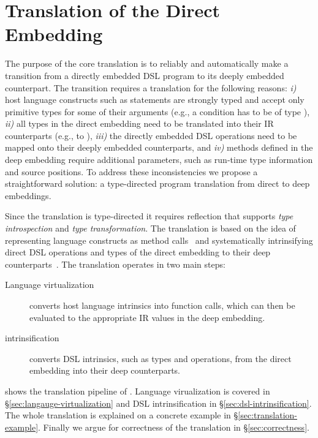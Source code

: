 \chapter{Translation of the Direct Embedding}
\label{sec:translation}

The purpose of the core \yy translation is to reliably and automatically make
a transition from a directly embedded DSL program to its deeply embedded
counterpart. The transition requires a translation for the following reasons:
\emph{i)} host language constructs such as  statements are strongly
typed and accept only primitive types for some of their arguments (e.g., a
condition has to be of type ), \emph{ii)} all types in the direct
embedding need to be translated into their IR counterparts (e.g.,  to
), \emph{iii)} the directly embedded DSL operations need to be
mapped onto their deeply embedded counterparts, and \emph{iv)} methods defined
in the deep embedding require additional parameters, such as run-time type
information and source positions. To address these inconsistencies we propose a
straightforward solution: a type-directed program translation from direct to
deep embeddings.

Since the translation is type-directed it requires reflection that supports
 \emph{type introspection} and \emph{type transformation}. The translation is based on the idea of representing language constructs as method calls~\cite{carette_finally_2009,rompf_scala-virtualized:_2009} and systematically intrinsifying direct DSL operations and types of the direct embedding to their deep counterparts~\cite{carette_finally_2009}. The translation operates in two main steps:
\begin{description}
\item[Language virtualization] converts host language intrinsics into
  function calls, which can then be evaluated to the appropriate IR
  values in the deep embedding.
\item[\edsl{} intrinsification] converts DSL intrinsics, such as types and operations,
 from the direct embedding into their deep counterparts.
\end{description}

 shows the translation pipeline of \yy. Language virualization is covered
in \S \ref{sec:langauge-virtualization} and DSL intrinsification
in \S \ref{sec:dsl-intrinsification}. The whole translation is explained on a concrete example
in \S \ref{sec:translation-example}. Finally we argue for correctness of the translation
in \S \ref{sec:correctness}.

